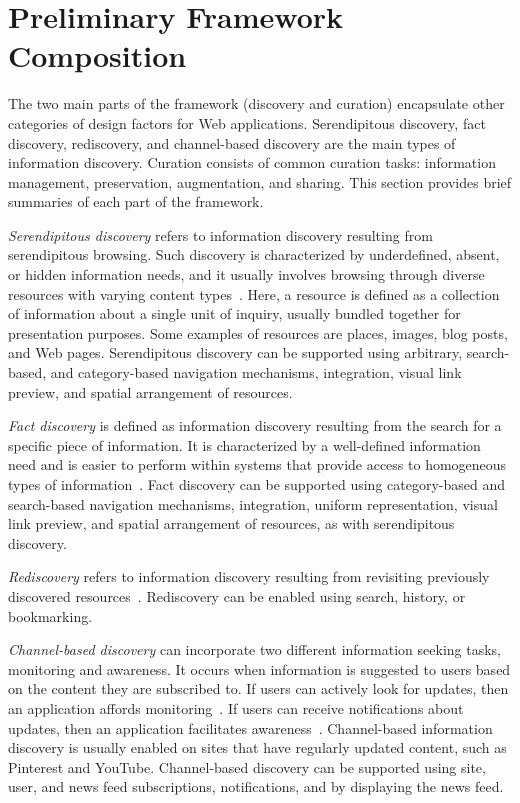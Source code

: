 {\section{Preliminary Framework Composition}
The two main parts of the framework (discovery and curation) encapsulate other categories of design factors for Web applications. Serendipitous discovery, fact discovery, rediscovery, and channel-based discovery are the main types of information discovery. Curation consists of common curation tasks: information management, preservation, augmentation, and sharing. This section provides brief summaries of each part of the framework.
\pagebreak

\textit{Serendipitous discovery} refers to information discovery resulting from serendipitous browsing. Such discovery is characterized by underdefined, absent, or hidden information needs, and it usually involves browsing through diverse resources with varying content types~\cite{kellar2006goal, kellar2007field}. Here, a resource is defined as a collection of information about a single unit of inquiry, usually bundled together for presentation purposes. Some examples of resources are places, images, blog posts, and Web pages. Serendipitous discovery can be supported using arbitrary, search-based, and category-based navigation mechanisms, integration, visual link preview, and spatial arrangement of resources.

\textit{Fact discovery} is defined as information discovery resulting from the search for a specific piece of information. It is characterized by a well-defined information need and is easier to perform within systems that provide access to homogeneous types of information~\cite{kellar2006goal, lindley2012s}. Fact discovery can be supported using category-based and search-based navigation mechanisms, integration, uniform representation, visual link preview, and spatial arrangement of resources, as with serendipitous discovery. 

\textit{Rediscovery} refers to information discovery resulting from revisiting previously discovered resources~\cite{tauscher1997people}. Rediscovery can be enabled using search, history, or bookmarking.

\textit{Channel-based discovery} can incorporate two different information seeking tasks, monitoring and awareness. It occurs when information is suggested to users based on the content they are subscribed to. If users can actively look for updates, then an application affords monitoring~\cite{morrison2001taxonomic}. If users can receive notifications about updates, then an application facilitates awareness~\cite{bates1986exploratory,bates2002toward}. Channel-based information discovery is usually enabled on sites that have regularly updated content, such as Pinterest and YouTube. Channel-based discovery can be supported using site, user, and news feed subscriptions, notifications, and by displaying the news feed.   

}
